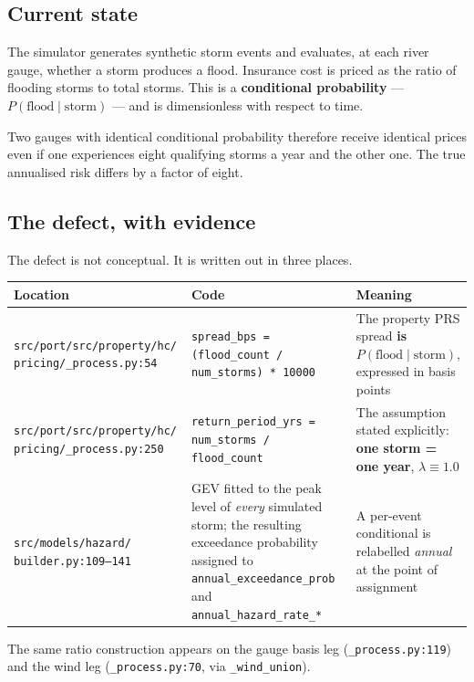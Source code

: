 \documentclass[11pt]{article}
\begin{document}
\subsection{Current state}

The simulator generates synthetic storm events and evaluates, at each river
gauge, whether a storm produces a flood. Insurance cost is priced as the ratio
of flooding storms to total storms. This is a \textbf{conditional probability}
--- $P(\text{flood} \mid \text{storm})$ --- and is dimensionless with respect to
time.

Two gauges with identical conditional probability therefore receive identical
prices even if one experiences eight qualifying storms a year and the other one.
The true annualised risk differs by a factor of eight.

\subsection{The defect, with evidence}

The defect is not conceptual. It is written out in three places.

\begin{longtable}{@{}p{}p{}p{}@{}}
\toprule
\textbf{Location} & \textbf{Code} & \textbf{Meaning} \\
\midrule
\endhead
\texttt{src/port/src/property/hc/} \texttt{pricing/\_process.py:54} &
\texttt{spread\_bps = (flood\_count / num\_storms) * 10000} &
The property PRS spread \textbf{is} $P(\text{flood} \mid \text{storm})$,
expressed in basis points \\
\addlinespace
\texttt{src/port/src/property/hc/} \texttt{pricing/\_process.py:250} &
\texttt{return\_period\_yrs = num\_storms / flood\_count} &
The assumption stated explicitly: \textbf{one storm = one year},
$\lambda \equiv 1.0$ \\
\addlinespace
\texttt{src/models/hazard/} \texttt{builder.py:109--141} &
GEV fitted to the peak level of \emph{every} simulated storm; the resulting
exceedance probability assigned to \texttt{annual\_exceedance\_prob} and
\texttt{annual\_hazard\_rate\_*} &
A per-event conditional is relabelled \emph{annual} at the point of assignment \\
\bottomrule
\end{longtable}

\noindent The same ratio construction appears on the gauge basis leg
(\texttt{\_process.py:119}) and the wind leg (\texttt{\_process.py:70}, via
\texttt{\_wind\_union}).
\end{document}
